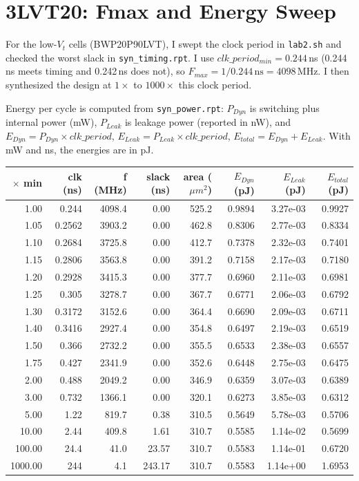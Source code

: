 \documentclass[11pt]{article}
\begin{document}
\section*{3\quad LVT20: Fmax and Energy Sweep}

For the low-$V_t$ cells (BWP20P90LVT), I swept the clock period in \texttt{lab2.sh} and checked the worst slack in \texttt{syn\_timing.rpt}. I use $clk\_period_{min} = 0.244$\,ns (0.244\,ns meets timing and 0.242\,ns does not), so $F_{max} = 1/0.244\,\text{ns} = 4098$\,MHz. I then synthesized the design at $1\times$ to $1000\times$ this clock period.

Energy per cycle is computed from \texttt{syn\_power.rpt}: $P_{Dyn}$ is switching plus internal power (mW), $P_{Leak}$ is leakage power (reported in nW), and $E_{Dyn} = P_{Dyn} \times clk\_period$, $E_{Leak} = P_{Leak} \times clk\_period$, $E_{total} = E_{Dyn} + E_{Leak}$. With mW and ns, the energies are in pJ.
\begin{center}
\small
\begin{tabular}{r|r|r|r|r|r|r|r}
\hline
$\times$ min & clk (ns) & f (MHz) & slack (ns) & area ($\mu m^2$) & $E_{Dyn}$ (pJ) & $E_{Leak}$ (pJ) & $E_{total}$ (pJ) \\
\hline
1.00 & 0.244 & 4098.4 & 0.00 & 525.2 & 0.9894 & 3.27e-03 & 0.9927 \\
1.05 & 0.2562 & 3903.2 & 0.00 & 462.8 & 0.8306 & 2.77e-03 & 0.8334 \\
1.10 & 0.2684 & 3725.8 & 0.00 & 412.7 & 0.7378 & 2.32e-03 & 0.7401 \\
1.15 & 0.2806 & 3563.8 & 0.00 & 391.2 & 0.7158 & 2.17e-03 & 0.7180 \\
1.20 & 0.2928 & 3415.3 & 0.00 & 377.7 & 0.6960 & 2.11e-03 & 0.6981 \\
1.25 & 0.305 & 3278.7 & 0.00 & 367.7 & 0.6771 & 2.06e-03 & 0.6792 \\
1.30 & 0.3172 & 3152.6 & 0.00 & 364.4 & 0.6690 & 2.09e-03 & 0.6711 \\
1.40 & 0.3416 & 2927.4 & 0.00 & 354.8 & 0.6497 & 2.19e-03 & 0.6519 \\
1.50 & 0.366 & 2732.2 & 0.00 & 355.5 & 0.6533 & 2.38e-03 & 0.6557 \\
1.75 & 0.427 & 2341.9 & 0.00 & 352.6 & 0.6448 & 2.75e-03 & 0.6475 \\
2.00 & 0.488 & 2049.2 & 0.00 & 346.9 & 0.6359 & 3.07e-03 & 0.6389 \\
3.00 & 0.732 & 1366.1 & 0.00 & 320.1 & 0.6273 & 3.85e-03 & 0.6312 \\
5.00 & 1.22 & 819.7 & 0.38 & 310.5 & 0.5649 & 5.78e-03 & 0.5706 \\
10.00 & 2.44 & 409.8 & 1.61 & 310.7 & 0.5585 & 1.14e-02 & 0.5699 \\
100.00 & 24.4 & 41.0 & 23.57 & 310.7 & 0.5583 & 1.14e-01 & 0.6720 \\
1000.00 & 244 & 4.1 & 243.17 & 310.7 & 0.5583 & 1.14e+00 & 1.6953 \\
\hline
\end{tabular}
\end{center}
\end{document}
